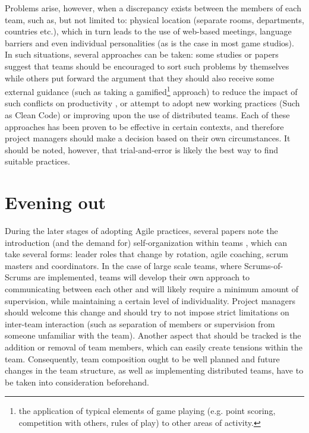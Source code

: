 \documentclass{scrartcl}
\begin{document}
    Problems arise, however, when a discrepancy exists between the members of each team, such as, but not limited to: physical location (separate rooms, departments, countries etc.), which in turn leads to the use of web-based meetings, language barriers and even individual personalities (as is the case in most game studios). In such situations, several approaches can be taken: some studies or papers suggest that teams should be encouraged to sort such problems by themselves \cite{4599458, 4599456, 4293601} while others put forward the argument that they should also receive some external guidance (such as taking a gamified\footnote{the application of typical elements of game playing (e.g. point scoring, competition with others, rules of play) to other areas of activity.} approach) to reduce the impact of such conflicts on productivity \cite{7883385, 6475422}, or attempt to adopt new working practices (Such as Clean Code\cite{cleancode}) or improving upon the use of distributed teams. Each of these approaches has been proven to be effective in certain contexts, and therefore project managers should make a decision based on their own circumstances. It should be noted, however, that trial-and-error is likely the best way to find suitable practices\cite{4599458, 4599456, 6475422}.
    
    \section{Evening out}
    
    During the later stages of adopting Agile practices, several papers note the introduction (and the demand for) self-organization within teams \cite{4599458, 4599456, 6986022, 8064437, 6475422}, which can take several forms: leader roles that change by rotation, agile coaching, scrum masters and coordinators. In the case of large scale teams, where Scrums-of-Scrums\cite{Scrum} are implemented, teams will develop their own approach to communicating between each other and will likely require a minimum amount of supervision, while maintaining a certain level of individuality. Project managers should welcome this change and should try to not impose strict limitations on inter-team interaction (such as separation of members or supervision from someone unfamiliar with the team). Another aspect that should be tracked is the addition or removal of team members, which can easily create tensions within the team. Consequently, team composition ought to be well planned and future changes in the team structure, as well as implementing distributed teams, have to be taken into consideration beforehand.
    
\end{document}
